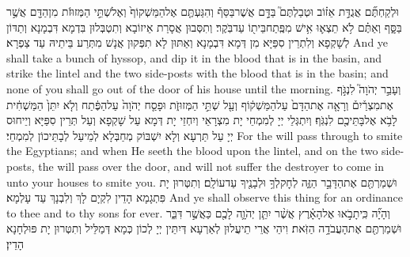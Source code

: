 {וּלְקַחְתֶּ֞ם אֲגֻדַּ֣ת אֵז֗וֹב וּטְבַלְתֶּם֮ בַּדָּ֣ם אֲשֶׁר\maqqaf בַּסַּף֒ וְהִגַּעְתֶּ֤ם אֶל\maqqaf הַמַּשְׁקוֹף֙ וְאֶל\maqqaf שְׁתֵּ֣י הַמְּזוּזֹ֔ת מִן\maqqaf הַדָּ֖ם אֲשֶׁ֣ר בַּסָּ֑ף וְאַתֶּ֗ם לֹ֥א תֵצְא֛וּ אִ֥ישׁ מִפֶּֽתַח\maqqaf בֵּית֖וֹ עַד\maqqaf בֹּֽקֶר׃}
{וְתִסְּבוּן אֲסָרַת אֵיזוֹבָא וְתִטְבְּלוּן בִּדְמָא דִּבְמָנָא וְתַדּוֹן לְשָׁקְפָא וְלִתְרֵין סִפַּיָּא מִן דְּמָא דִּבְמָנָא וְאַתּוּן לָא תִפְּקוּן אֲנָשׁ מִתְּרַע בֵּיתֵיהּ עַד צַפְרָא׃}
{And ye shall take a bunch of hyssop, and dip it in the blood that is in the basin, and strike the lintel and the two side-posts with the blood that is in the basin; and none of you shall go out of the door of his house until the morning.}{}
{וְעָבַ֣ר יְהֹוָה֮ לִנְגֹּ֣ף אֶת\maqqaf מִצְרַ֒יִם֒ וְרָאָ֤ה אֶת\maqqaf הַדָּם֙ עַל\maqqaf הַמַּשְׁק֔וֹף וְעַ֖ל שְׁתֵּ֣י הַמְּזוּזֹ֑ת וּפָסַ֤ח יְהֹוָה֙ עַל\maqqaf הַפֶּ֔תַח וְלֹ֤א יִתֵּן֙ הַמַּשְׁחִ֔ית לָבֹ֥א אֶל\maqqaf בָּתֵּיכֶ֖ם לִנְגֹּֽף׃}
{וְיִתְגְּלֵי יְיָ לְמִמְחֵי יָת מִצְרָאֵי וְיִחְזֵי יָת דְּמָא עַל שָׁקְפָא וְעַל תְּרֵין סִפַּיָּא וְיֵיחוּס יְיָ עַל תַּרְעָא וְלָא יִשְׁבּוֹק מְחַבְּלָא לְמֵיעַל לְבָתֵּיכוֹן לְמִמְחֵי׃}
{For the \lord\space will pass through to smite the Egyptians; and when He seeth the blood upon the lintel, and on the two side-posts, the \lord\space will pass over the door, and will not suffer the destroyer to come in unto your houses to smite you.}{}
{וּשְׁמַרְתֶּ֖ם אֶת\maqqaf הַדָּבָ֣ר הַזֶּ֑ה לְחׇק\maqqaf לְךָ֥ וּלְבָנֶ֖יךָ עַד\maqqaf עוֹלָֽם׃}
{וְתִטְּרוּן יָת פִּתְגָמָא הָדֵין לִקְיָם לָךְ וְלִבְנָךְ עַד עָלְמָא׃}
{And ye shall observe this thing for an ordinance to thee and to thy sons for ever.}{}
{וְהָיָ֞ה כִּֽי\maqqaf תָבֹ֣אוּ אֶל\maqqaf הָאָ֗רֶץ אֲשֶׁ֨ר יִתֵּ֧ן יְהֹוָ֛ה לָכֶ֖ם כַּאֲשֶׁ֣ר דִּבֵּ֑ר וּשְׁמַרְתֶּ֖ם אֶת\maqqaf הָעֲבֹדָ֥ה הַזֹּֽאת׃}
{וִיהֵי אֲרֵי תֵיעֲלוּן לְאַרְעָא דְּיִתֵּין יְיָ לְכוֹן כְּמָא דְּמַלֵּיל וְתִטְּרוּן יָת פּוּלְחָנָא הָדֵין׃}

